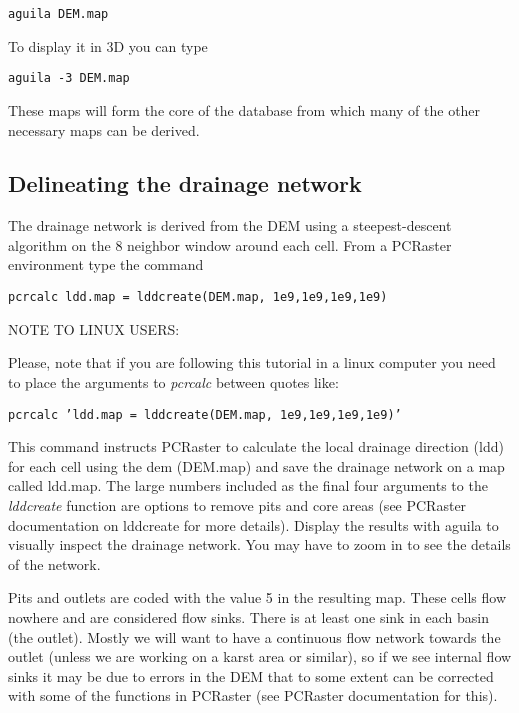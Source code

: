 \begin{verbatim}
aguila DEM.map
\end{verbatim}  
  
To display it in 3D you can type 

\begin{verbatim}
aguila -3 DEM.map
\end{verbatim}

These maps will form the core of the database from which many of the other necessary maps can be derived. 

\subsection{Delineating the drainage network}

The drainage network is derived from the DEM using a steepest-descent algorithm on the 8 neighbor window around each cell. From a PCRaster environment type the command

\begin{verbatim}
pcrcalc ldd.map = lddcreate(DEM.map, 1e9,1e9,1e9,1e9)
\end{verbatim}

 \medskip 
\begin{Frame}
NOTE TO LINUX USERS:

Please, note that if you are following this tutorial in a linux computer you need to place the arguments to \textit{pcrcalc} between quotes like:

\texttt{pcrcalc 'ldd.map = lddcreate(DEM.map, 1e9,1e9,1e9,1e9)'}
 
\end{Frame}
 \medskip

This command instructs PCRaster to calculate the local drainage direction (ldd) for each cell using the dem (\textsf{DEM.map}) and save the drainage network on a map called \textsf{ldd.map}. The large numbers included as the final four arguments to the \emph{lddcreate} function are options to remove pits and core areas (see PCRaster documentation on lddcreate for more details). Display the results with aguila to visually inspect the drainage network. You may have to zoom in to see the details of the network. 

Pits and outlets are coded with the value 5 in the resulting map. These cells flow nowhere and are considered flow sinks. There is at least one sink in each basin (the outlet). Mostly we will want to have a continuous flow network towards the outlet (unless we are working on a karst area or similar), so if we see internal flow sinks it may be due to errors in the DEM that to some extent can be corrected with some of the functions in PCRaster (see PCRaster documentation for this).  

